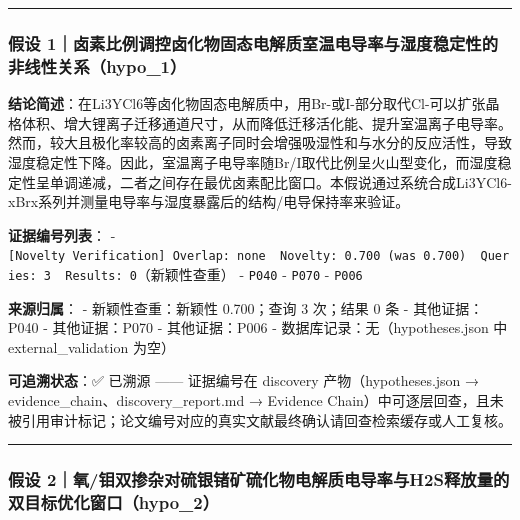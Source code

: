\documentclass[12pt,a4paper]{ctexart}
\begin{document}
\begin{center}\rule{0.5\linewidth}{0.5pt}\end{center}

\subsubsection{假设 1｜卤素比例调控卤化物固态电解质室温电导率与湿度稳定性的非线性关系（hypo\_1）}\label{ux5047ux8bbe-1ux5364ux7d20ux6bd4ux4f8bux8c03ux63a7ux5364ux5316ux7269ux56faux6001ux7535ux89e3ux8d28ux5ba4ux6e29ux7535ux5bfcux7387ux4e0eux6e7fux5ea6ux7a33ux5b9aux6027ux7684ux975eux7ebfux6027ux5173ux7cfbhypo_1}

\textbf{结论简述}：在Li3YCl6等卤化物固态电解质中，用Br-或I-部分取代Cl-可以扩张晶格体积、增大锂离子迁移通道尺寸，从而降低迁移活化能、提升室温离子电导率。然而，较大且极化率较高的卤素离子同时会增强吸湿性和与水分的反应活性，导致湿度稳定性下降。因此，室温离子电导率随Br/I取代比例呈火山型变化，而湿度稳定性呈单调递减，二者之间存在最优卤素配比窗口。本假说通过系统合成Li3YCl6-xBrx系列并测量电导率与湿度暴露后的结构/电导保持率来验证。

\textbf{证据编号列表}： - \texttt{{[}Novelty\ Verification{]}\ Overlap:\ none\ \textbar{}\ Novelty:\ 0.700\ (was\ 0.700)\ \textbar{}\ Queries:\ 3\ \textbar{}\ Results:\ 0}（新颖性查重） - \texttt{P040} - \texttt{P070} - \texttt{P006}

\textbf{来源归属}： - 新颖性查重：新颖性 0.700；查询 3 次；结果 0 条 - 其他证据：P040 - 其他证据：P070 - 其他证据：P006 - 数据库记录：无（hypotheses.json 中 external\_validation 为空）

\textbf{可追溯状态}：✅ 已溯源 ------ 证据编号在 discovery 产物（hypotheses.json → evidence\_chain、discovery\_report.md → Evidence Chain）中可逐层回查，且未被引用审计标记；论文编号对应的真实文献最终确认请回查检索缓存或人工复核。

\begin{center}\rule{0.5\linewidth}{0.5pt}\end{center}

\subsubsection{假设 2｜氧/钼双掺杂对硫银锗矿硫化物电解质电导率与H2S释放量的双目标优化窗口（hypo\_2）}\label{ux5047ux8bbe-2ux6c27ux94bcux53ccux63baux6742ux5bf9ux786bux94f6ux9517ux77ffux786bux5316ux7269ux7535ux89e3ux8d28ux7535ux5bfcux7387ux4e0eh2sux91caux653eux91cfux7684ux53ccux76eeux6807ux4f18ux5316ux7a97ux53e3hypo_2}
\end{document}
